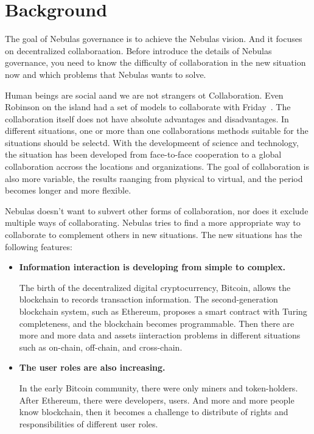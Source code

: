 \section{Background}

The goal of Nebulas governance is to achieve the Nebulas vision. And it focuses on decentralized collaboraation. Before introduce the details of Nebulas governance, you need to know the difficulty of collaboration in the new situation now and which problems that Nebulas wants to solve.

\label{background}

Human beings are social aand we are not strangers ot Collaboration. Even Robinson on the island had a set of models to collaborate with Friday~\cite{robinson}. The collaboration itself does not have absolute advantages and disadvantages. In different situations, one or more than one collaborations methods suitable for the situations should be selectd. With the developmeent of science and technology, the situation has been developed from face-to-face cooperation to a global collaboration accross the locations and organizations. The goal of collaboration is also more variable, the results raanging from physical to virtual, and the period becomes longer and more flexible.

Nebulas doesn't want to subvert other forms of collaboration, nor does it exclude multiple ways of collaborating. Nebulas tries to find a more appropriate way to collaborate to complement others in new situations. The new situations has the following features:

\begin{itemize}
	\item \textbf{Information interaction is developing from simple to complex.}

	The birth of the decentralized digital cryptocurrency, Bitcoin, allows the blockchain to records transaction information. The second-generation blockchain system, such as Ethereum, proposes a smart contract with Turing completeness, and the blockchain becomes programmable. Then there are more and more data and assets iinteraction problems in different situations such as on-chain, off-chain, and cross-chain.

	\item \textbf{The user roles are also increasing.}

	In the early Bitcoin community, there were only miners and token-holders. After Ethereum, there were developers, users. And more and more people know blockchain, then it becomes a challenge to distribute of rights and responsibilities of different user roles.

\end{itemize}

